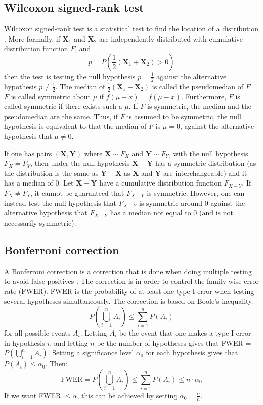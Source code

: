 \subsection{Wilcoxon signed-rank test}
\label{subsec:wilcoxon-signed-rank}
Wilcoxon signed-rank test is a statistical test to find the location of a distribution \citep{signed-rank-test,signed-rank-2}. More formally, if $\mathbf{X}_1$ and $\mathbf{X}_2$ are independently distributed with cumulative distribution function $\mathit{F}$, and
$$p = P\left(\frac{1}{2}(\mathbf{X}_1 + \mathbf{X}_2) > 0\right)$$
then the test is testing the null hypothesis $p = \frac{1}{2}$ against the alternative hypothesis $p \not = \frac{1}{2}$. The median of $\frac{1}{2}(\mathbf{X}_1 + \mathbf{X}_2)$ is called the pseudomedian of $\mathit{F}$. $\mathit{F}$ is called symmetric about $\mu$ if $f(\mu + x) = f(\mu - x)$. Furthermore, $\mathit{F}$ is called symmetric if there exists such a $\mu$. If $\mathit{F}$ is symmetric, the median and the pseudomedian are the same. Thus, if $\mathit{F}$ is assumed to be symmetric, the null hypothesis is equivalent to that the median of $\mathit{F}$ is $\mu = 0$, against the alternative hypothesis that $\mu \not = 0$.

If one has pairs $(\mathbf{X}, \mathbf{Y})$ where $\mathbf{X} \sim \mathit{F}_X$ and $\mathbf{Y} \sim \mathit{F}_Y$, with the null hypothesis $\mathit{F}_X = \mathit{F}_Y$, then under the null hypothesis $\mathbf{X} - \mathbf{Y}$ has a symmetric distribution (as the distribution is the same as $\mathbf{Y} - \mathbf{X}$ as $\mathbf{X}$ and $\mathbf{Y}$ are interchangeable) and it has a median of $0$. Let $\mathbf{X} - \mathbf{Y}$ have a cumulative distribution function $\mathit{F}_{X-Y}$. If $\mathit{F}_X \not = \mathit{F}_Y$, it cannot be guaranteed that $\mathit{F}_{X-Y}$ is symmetric. However, one can instead test the null hypothesis that $\mathit{F}_{X-Y}$ is symmetric around $0$ against the alternative hypothesis that $\mathit{F}_{X-Y}$ has a median not equal to $0$ (and is not necessarily symmetric).

\subsection{Bonferroni correction}
A Bonferroni correction is a correction that is done when doing multiple testing to avoid false positives \citep{bonferroni}. The correction is in order to control the family-wise error rate (FWER). FWER is the probability of at least one type I error when testing several hypotheses simultaneously. The correction is based on Boole's inequality:
$$P(\bigcup_{i=1}^n A_i) \leq \sum_{i=1}^n P(A_i)$$
for all possible events $A_i$. Letting $A_i$ be the event that one makes a type I error in hypothesis $i$, and letting $n$ be the number of hypotheses gives that FWER = $P(\bigcup_{i=1}^n A_i)$. Setting a significance level $\alpha_0$ for each hypothesis gives that $P(A_i) \leq \alpha_0$. Then:
$$\text{FWER} = P(\bigcup_{i=1}^n A_i) \leq \sum_{i=1}^n P(A_i) \leq n \cdot \alpha_0$$
If we want FWER $\leq \alpha$, this can be achieved by setting $\alpha_0 = \frac{\alpha}{n}$.

